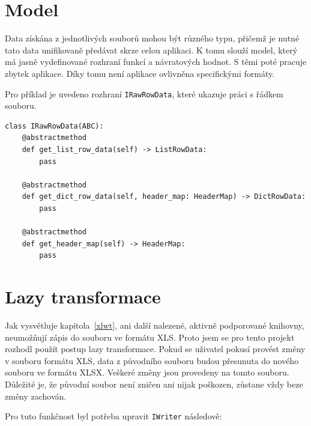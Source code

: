 \section{Model}

Data získána z jednotlivých souborů mohou být různého typu, přičemž je nutné tato data unifikovaně předávat skrze celou aplikaci. K tomu slouží model, který má jasně vydefinované rozhraní funkcí a návratových hodnot. S těmi poté pracuje zbytek aplikace. Díky tomu není aplikace ovlivněna specifickými formáty.

Pro příklad je uvedeno rozhraní \texttt{IRawRowData}, které ukazuje práci s řádkem souboru.

\begin{listing}[H]
    \begin{verbatim}
class IRawRowData(ABC):
    @abstractmethod
    def get_list_row_data(self) -> ListRowData:
        pass

    @abstractmethod
    def get_dict_row_data(self, header_map: HeaderMap) -> DictRowData:
        pass

    @abstractmethod
    def get_header_map(self) -> HeaderMap:
        pass
    \end{verbatim}
    
    \caption{Rozhraní modelu \texttt{IRawRowData} - vlastní tvorba}
    \label{list:demo-library}
\end{listing}

\section{Lazy transformace}
\label{laze transform}

Jak vysvětluje kapitola~\ref{xlwt}, ani další nalezené, aktivně podporované knihovny, neumožňují zápis do souboru ve formátu XLS. Proto jsem se pro tento projekt rozhodl použít postup lazy transformace. Pokud se uživatel pokusí provést změny v souboru formátu XLS, data z původního souboru budou přesunuta do nového souboru ve formátu XLSX. Veškeré změny jsou provedeny na tomto souboru. Důležité je, že původní soubor není zničen ani nijak poškozen, zůstane vždy beze změny zachován.

Pro tuto funkčnost byl potřeba upravit \texttt{IWriter} následově:

